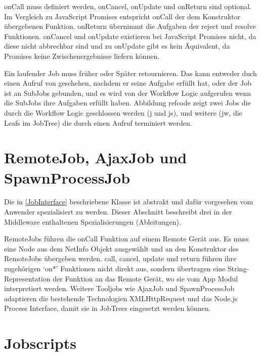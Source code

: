 onCall muss definiert werden, onCancel, onUpdate und onReturn sind optional.
Im Vergleich zu JavaScript Promises entspricht onCall der dem Konstruktor übergebenen Funktion.
onReturn übernimmt die Aufgaben der reject und resolve Funktionen.
onCancel und onUpdate existieren bei JavaScript Promises nicht, da diese nicht abbrechbar sind und zu onUpdate gibt es kein Äquivalent, da Promises keine Zwischenergebnisse liefern können.

Ein laufender Job muss früher oder Später retournieren.
Das kann entweder duch einen Aufruf von \JobReturn{} geschehen, nachdem er seine Aufgabe erfüllt hat,
oder der Job ist an SubJobs gebunden, und es wird von der Workflow Logic aufgerufen wenn die SubJobs ihre Aufgaben erfüllt haben.
Abbildung ŗef{code} zeigt zwei Jobs die durch die Workflow Logic geschlossen werden (j und js),
und weitere (jw, die Leafs im JobTree) die durch einen \JobReturn{} Aufruf terminiert werden.





\section{RemoteJob, AjaxJob und SpawnProcessJob}
Die in \ref{JobInterface} beschriebene Klasse ist abstrakt und dafür vorgesehen vom Anwender spezialisiert zu werden.
Dieser Abschnitt beschreibt drei in der Middleware enthaltenen Spezialisierungen (Ableitungen).

RemoteJobs führen die onCall Funktion auf einem Remote Gerät aus.
Es muss eine Node aus dem NetInfo Objekt ausgewählt und an den Konstruktor des RemoteJobs übergeben werden.
call, cancel, update und return führen ihre zugehörigen ‘on*’ Funktionen nicht direkt aus, sondern übertragen eine String-Representation der Funktion an das Remote Gerät, wo sie vom App Modul interpretiert werden.
Weitere Tooljobs wie AjaxJob und SpawnProcessJob adaptieren die bestehende Technologien XMLHttpRequest und das Node.js Process Interface, damit sie in JobTrees eingesetzt werden können.




\section{Jobscripts}

